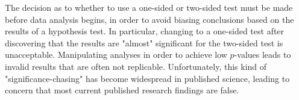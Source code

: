 \begin{spacing}{1.5}
The decision as to whether to use a one-sided or two-sided test must be made before data analysis begins, in order to avoid biasing conclusions based on the results of a hypothesis test. In particular, changing to a one-sided test after discovering that the results are "almost" significant for the two-sided test is unacceptable. Manipulating analyses in order to achieve low $p$-values leads to invalid results that are often not replicable. Unfortunately, this kind of "significance-chasing" has become widespread in published science, leading to concern that most current published research findings are false.

\end{spacing}
